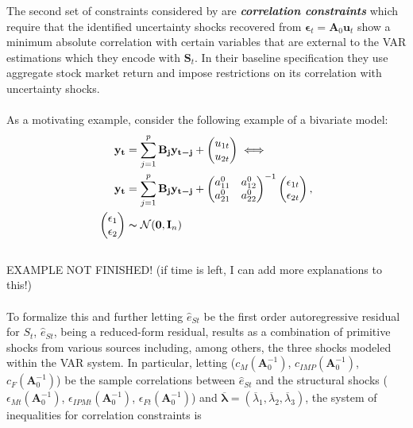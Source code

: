 \documentclass[a4paper,11pt,listof=nochaptergap,oneside,pointednumbers,bibtotoc,bigheadings,liststotoc]{scrbook}
\theoremstyle{mysatz}
\theoremstyle{mydefinition}
\theoremstyle{mybemerkung}
\newcommand{\vect}[1]{\boldsymbol{\mathbf{#1}}}
\begin{document}
\begin{itemize}
The second set of constraints considered by \citet{ludvigsonetal:18} are \textbf{\textit{correlation constraints}} which require that the identified uncertainty shocks recovered from $\vect{\epsilon}_t = \vect{A}_0\vect{u}_t$ show a minimum absolute correlation with certain variables that are external to the VAR estimations which they encode with $\vect{S}_t$. In their baseline specification they use aggregate stock market return and impose restrictions on its correlation with uncertainty shocks. \\
\\
As a motivating example, \citet{ludvigsonetal:17} consider the following example of a bivariate model:
\begin{equation} \label{eq:svar_ludvi12_a}
\begin{split}
	\vect{y_t} & = \sum_{j=1}^{p} \vect{B_j}\vect{y_{t-j}} + 
		\begin{pmatrix}
			u_{1t} \\
			u_{2t}
		\end{pmatrix} \iff \\
\vect{y_t} & = \sum_{j=1}^{p} \vect{B_j}\vect{y_{t-j}} + 	
					\begin{pmatrix}
    			a_{11}^0 &  a_{12}^0 \\
			a_{21}^0 &  a_{22}^0
 			\end{pmatrix}^{-1}
		\begin{pmatrix}
			\epsilon_{1t} \\
			\epsilon_{2t}
		\end{pmatrix},\\
		\begin{pmatrix}
			\epsilon_1 \\
			\epsilon_2
		\end{pmatrix} & \thicksim \mathcal{N}(\vect{0}, \vect{I}_n)
\end{split}								
\end{equation}
\\
EXAMPLE NOT FINISHED! (if time is left, I can add more explanations to this!)
\\
\\
To formalize this and further letting $\hat{e}_{St}$ be the first order autoregressive residual for $S_t$, $\hat{e}_{St}$, being a reduced-form residual, results as a combination of primitive shocks from various sources including, among others, the three shocks modeled within the VAR system. In particular, letting ($c_M(\vect{A}_0^{-1})$, $c_{IMP}(\vect{A}_0^{-1})$, $c_{F}(\vect{A}_0^{-1})$) be the sample correlations between $\hat{e}_{St}$ and the structural shocks ($\epsilon_{Mt}(\vect{A}_0^{-1})$, $\epsilon_{IPMt}(\vect{A}_0^{-1})$, $\epsilon_{Ft}(\vect{A}_0^{-1})$) and $\overline{\vect{\lambda}} = (\overline{\lambda}_1, \overline{\lambda}_2, \overline{\lambda}_3)$, the system of inequalities for correlation constraints is

\end{itemize}
\end{document}
